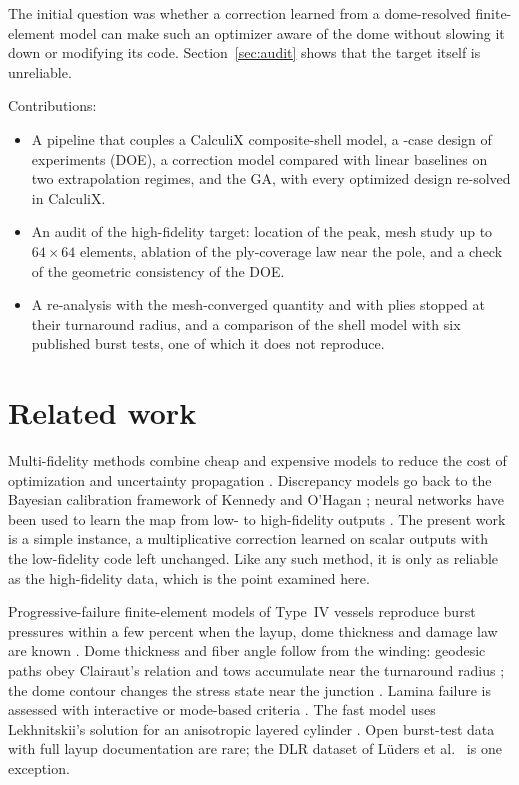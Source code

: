 \documentclass[11pt]{article}
\begin{document}
The initial question was whether a correction learned from a dome-resolved finite-element model can make such an optimizer aware of the dome without slowing it down or modifying its code. Section~\ref{sec:audit} shows that the target itself is unreliable.

Contributions:
\begin{itemize}
\item A pipeline that couples a CalculiX composite-shell model, a \NdoeCases{}-case design of experiments (DOE), a correction model compared with linear baselines on two extrapolation regimes, and the GA, with every optimized design re-solved in CalculiX.
\item An audit of the high-fidelity target: location of the peak, mesh study up to $64\times64$ elements, ablation of the ply-coverage law near the pole, and a check of the geometric consistency of the DOE.
\item A re-analysis with the mesh-converged quantity and with plies stopped at their turnaround radius, and a comparison of the shell model with six published burst tests, one of which it does not reproduce.
\end{itemize}

\section{Related work}

Multi-fidelity methods combine cheap and expensive models to reduce the cost of optimization and uncertainty propagation \cite{Peherstorfer2018}. Discrepancy models go back to the Bayesian calibration framework of Kennedy and O'Hagan \cite{KennedyOHagan2001}; neural networks have been used to learn the map from low- to high-fidelity outputs \cite{MengKarniadakis2020}. The present work is a simple instance, a multiplicative correction learned on scalar outputs with the low-fidelity code left unchanged. Like any such method, it is only as reliable as the high-fidelity data, which is the point examined here.

Progressive-failure finite-element models of Type~IV vessels reproduce burst pressures within a few percent when the layup, dome thickness and damage law are known \cite{Leh2015,Hu2021,Jin2022,Agne2025}. Dome thickness and fiber angle follow from the winding: geodesic paths obey Clairaut's relation and tows accumulate near the turnaround radius \cite{Wang2022}; the dome contour changes the stress state near the junction \cite{Jois2021}. Lamina failure is assessed with interactive or mode-based criteria \cite{TsaiWu1971,Hashin1980,Puck1998}. The fast model uses Lekhnitskii's solution for an anisotropic layered cylinder \cite{Lekhnitskii1963}. Open burst-test data with full layup documentation are rare; the DLR dataset of L\"uders et al.\ \cite{Lueders2025} is one exception.
\end{document}
